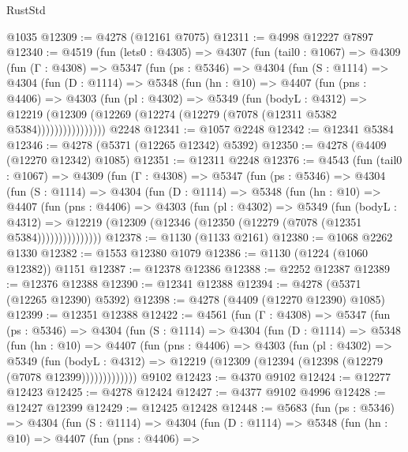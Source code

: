 \begin{lexlean}{RustStd}
\begin{coremodule}
{\begin{coremodule}
{{{{{{{{{{{{{{{{{{{{{{{{{{{{{{{{{{{    @1035
@12309 := @4278 (@12161 @7075)
@12311 := @4998 @12227 @7897
@12340 := @4519
    (fun (lets0 : @4305) =>
    @4307
      (fun (tail0 : @1067) =>
      @4309
        (fun (Γ : @4308) =>
        @5347
          (fun (ps : @5346) =>
          @4304
            (fun (S : @1114) =>
            @4304
              (fun (D : @1114) =>
              @5348
                (fun (hn : @10) =>
                @4407
                  (fun (pns : @4406) =>
                  @4303
                    (fun (pl : @4302) =>
                    @5349
                      (fun (bodyL : @4312) =>
                      @12219
                        (@12309 (@12269 (@12274 (@12279 (@7078 (@12311 @5382 @5384))))))))))))))))
    @2248
@12341 := @1057 @2248
@12342 := @12341 @5384
@12346 := @4278 (@5371 (@12265 @12342) @5392)
@12350 := @4278 (@4409 (@12270 @12342) @1085)
@12351 := @12311 @2248
@12376 := @4543
    (fun (tail0 : @1067) =>
    @4309
      (fun (Γ : @4308) =>
      @5347
        (fun (ps : @5346) =>
        @4304
          (fun (S : @1114) =>
          @4304
            (fun (D : @1114) =>
            @5348
              (fun (hn : @10) =>
              @4407
                (fun (pns : @4406) =>
                @4303
                  (fun (pl : @4302) =>
                  @5349
                    (fun (bodyL : @4312) =>
                    @12219 (@12309 (@12346 (@12350 (@12279 (@7078 (@12351 @5384)))))))))))))))
@12378 := @1130 (@1133 @2161)
@12380 := @1068 @2262 @1330
@12382 := @1553 @12380 @1079
@12386 := @1130 (@1224 (@1060 @12382)) @1151
@12387 := @12378 @12386
@12388 := @2252 @12387
@12389 := @12376 @12388
@12390 := @12341 @12388
@12394 := @4278 (@5371 (@12265 @12390) @5392)
@12398 := @4278 (@4409 (@12270 @12390) @1085)
@12399 := @12351 @12388
@12422 := @4561
    (fun (Γ : @4308) =>
    @5347
      (fun (ps : @5346) =>
      @4304
        (fun (S : @1114) =>
        @4304
          (fun (D : @1114) =>
          @5348
            (fun (hn : @10) =>
            @4407
              (fun (pns : @4406) =>
              @4303
                (fun (pl : @4302) =>
                @5349
                  (fun (bodyL : @4312) =>
                  @12219 (@12309 (@12394 (@12398 (@12279 (@7078 @12399)))))))))))))
    @9102
@12423 := @4370 @9102
@12424 := @12277 @12423
@12425 := @4278 @12424
@12427 := @4377 @9102 @4996
@12428 := @12427 @12399
@12429 := @12425 @12428
@12448 := @5683
    (fun (ps : @5346) =>
    @4304
      (fun (S : @1114) =>
      @4304
        (fun (D : @1114) =>
        @5348
          (fun (hn : @10) =>
          @4407
            (fun (pns : @4406) =>
}}}}}}}}}}}}}}}}}}}}}}}}}}}}}}}}}}}
\end{coremodule}}
\end{coremodule}
\end{lexlean}
